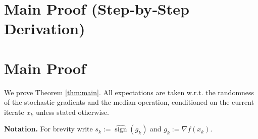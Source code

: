 \documentclass{article}
\newcommand{\sign}{\operatorname{sign}}
\begin{document}
\section*{Main Proof (Step‑by‑Step Derivation)}
\section{Main Proof}
We prove Theorem \ref{thm:main}.  All expectations are taken w.r.t.
the randomness of the stochastic gradients and the median operation,
conditioned on the current iterate $x_k$ unless stated otherwise.

\textbf{Notation.}
For brevity write $s_k:=\widehat{\sign}(g_k)$ and $g_k:=\nabla f(x_k)$.
\end{document}
